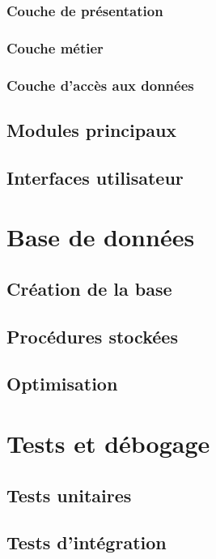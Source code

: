 \subsubsection{Couche de présentation}

\subsubsection{Couche métier}

\subsubsection{Couche d'accès aux données}

\subsection{Modules principaux}

\subsection{Interfaces utilisateur}

\section{Base de données}

\subsection{Création de la base}

\subsection{Procédures stockées}

\subsection{Optimisation}

\section{Tests et débogage}

\subsection{Tests unitaires}

\subsection{Tests d'intégration}

